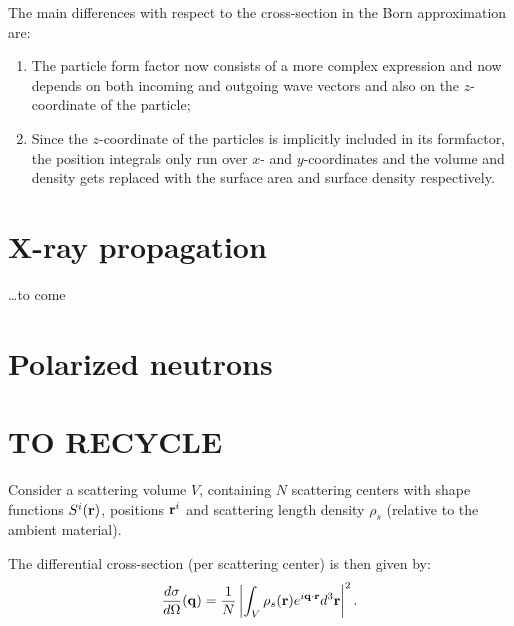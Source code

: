 The main differences with respect to the cross-section in the Born approximation are:
\begin{enumerate}
  \item The particle form factor now consists of a more complex expression and now depends on both incoming and outgoing wave vectors and also on the $z$-coordinate of the particle;
  \item Since the $z$-coordinate of the particles is implicitly included in its formfactor, the position integrals only run over $x$- and $y$-coordinates and the volume and density gets replaced with the surface area and surface density respectively.
\end{enumerate}

\section{X-ray propagation}\label{Sxray}

\ldots to come


\section{Polarized neutrons}\label{Snpol}



\section{TO RECYCLE}

Consider a scattering volume $V$, containing $N$ scattering centers with shape functions $S^i(\mathbf{r})$, positions $\mathbf{r}^i$ and scattering length density $\rho_s$ (relative to the ambient material).

The differential cross-section (per scattering center) is then given by:
\begin{equation}\label{Exsec1}
  \frac{d\sigma}{d\Omega}(\mathbf{q}) = \frac{1}{N}\left\lvert \int_V \rho_s(\mathbf{r}) e^{i\mathbf{q}\cdot\mathbf{r}} d^3\mathbf{r} \right\rvert ^2.
\end{equation}


